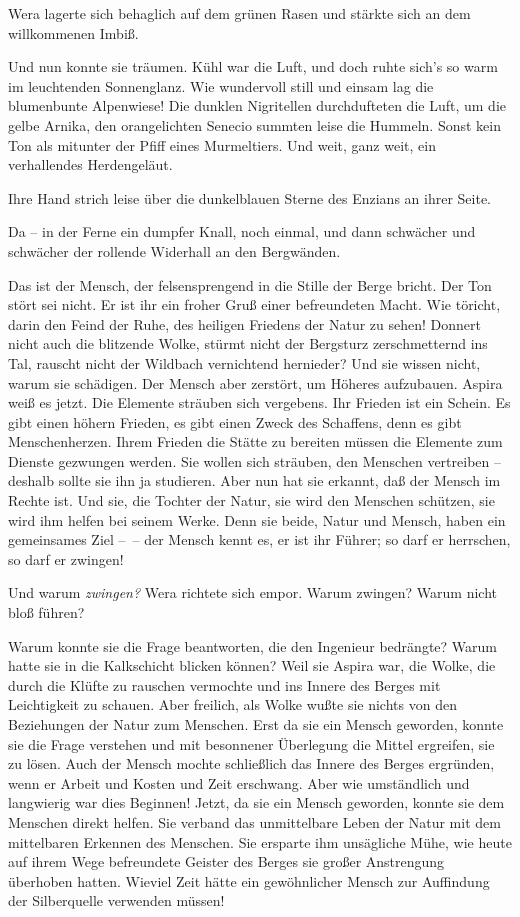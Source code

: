 Wera lagerte sich behaglich auf dem grünen Rasen und stärkte sich
an dem willkommenen Imbiß.

Und nun konnte sie träumen. Kühl war die Luft, und doch ruhte
sich's so warm im leuchtenden Sonnenglanz. Wie wundervoll still und
einsam lag die blumenbunte Alpenwiese! Die dunklen Nigritellen
durchdufteten die Luft, um die gelbe Arnika, den orangelichten
Senecio summten leise die Hummeln. Sonst kein Ton als mitunter der
Pfiff eines Murmeltiers. Und weit, ganz weit, ein verhallendes
Herdengeläut.

Ihre Hand strich leise über die dunkelblauen Sterne des Enzians an
ihrer Seite.

Da – in der Ferne ein dumpfer Knall, noch einmal, und dann
schwächer und schwächer der rollende Widerhall an den Bergwänden.

Das ist der Mensch, der felsensprengend in die Stille der Berge
bricht. Der Ton stört sei nicht. Er ist ihr ein froher Gruß einer
befreundeten Macht. Wie töricht, darin den Feind der Ruhe, des
heiligen Friedens der Natur zu sehen! Donnert nicht auch die
blitzende Wolke, stürmt nicht der Bergsturz zerschmetternd ins Tal,
rauscht nicht der Wildbach vernichtend hernieder? Und sie wissen
nicht, warum sie schädigen. Der Mensch aber zerstört, um Höheres
aufzubauen. Aspira weiß es jetzt. Die Elemente sträuben sich
vergebens. Ihr Frieden ist ein Schein. Es gibt einen höhern
Frieden, es gibt einen Zweck des Schaffens, denn es gibt
Menschenherzen. Ihrem Frieden die Stätte zu bereiten müssen die
Elemente zum Dienste gezwungen werden. Sie wollen sich sträuben,
den Menschen vertreiben – deshalb sollte sie ihn ja studieren. Aber
nun hat sie erkannt, daß der Mensch im Rechte ist. Und sie, die
Tochter der Natur, sie wird den Menschen schützen, sie wird ihm
helfen bei seinem Werke. Denn sie beide, Natur und Mensch, haben
ein gemeinsames Ziel –~– der Mensch kennt es, er ist ihr Führer; so
darf er herrschen, so darf er zwingen!

Und warum \emph{zwingen?} Wera richtete sich empor. Warum zwingen?
Warum nicht bloß führen?

Warum konnte sie die Frage beantworten, die den Ingenieur
bedrängte? Warum hatte sie in die Kalkschicht blicken können? Weil
sie Aspira war, die Wolke, die durch die Klüfte zu rauschen
vermochte und ins Innere des Berges mit Leichtigkeit zu schauen.
Aber freilich, als Wolke wußte sie nichts von den Beziehungen der
Natur zum Menschen. Erst da sie ein Mensch geworden, konnte sie die
Frage verstehen und mit besonnener Überlegung die Mittel ergreifen,
sie zu lösen. Auch der Mensch mochte schließlich das Innere des
Berges ergründen, wenn er Arbeit und Kosten und Zeit erschwang.
Aber wie umständlich und langwierig war dies Beginnen! Jetzt, da
sie ein Mensch geworden, konnte sie dem Menschen direkt helfen. Sie
verband das unmittelbare Leben der Natur mit dem mittelbaren
Erkennen des Menschen. Sie ersparte ihm unsägliche Mühe, wie heute
auf ihrem Wege befreundete Geister des Berges sie großer
Anstrengung überhoben hatten. Wieviel Zeit hätte ein gewöhnlicher
Mensch zur Auffindung der Silberquelle verwenden müssen!

